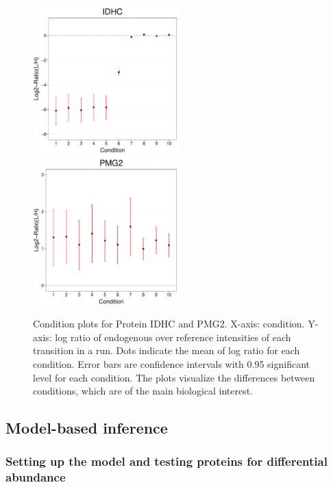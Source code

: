 \documentclass[11pt]{article}
\begin{document}
\begin{enumerate}
\begin{enumerate}
\begin{figure}[ht!]
\centering
\includegraphics[width=2.25in]{ConditionPlot1.pdf}
\includegraphics[width=2.25in]{ConditionPlot2.pdf}
\vspace{-0.3cm}
\caption{\small Condition plots for Protein IDHC and PMG2. X-axis: condition. Y-axis: log ratio of endogenous over reference intensities of each transition in a run. Dots indicate the mean of log ratio for each condition. Error bars are confidence intervals with 0.95 significant level for each condition.  The plots visualize the differences between conditions, which are of the main biological interest.}
\label{fig:Condition}
\end{figure}

\end{enumerate}

\end{enumerate}

\subsection{Model-based inference}

\subsubsection{Setting up the model and testing proteins for differential abundance \label{sec:SRMsetmodel}}
\end{document}
